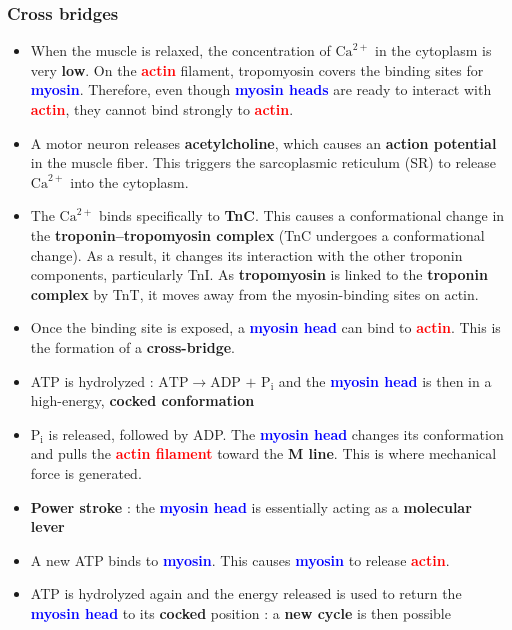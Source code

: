 \documentclass{article}
\begin{document}
\subsubsection{Cross bridges}
\begin{itemize}
    \item When the muscle is relaxed, the concentration of $\text{Ca}^{2+}$ in the cytoplasm is very \textbf{low}. On the \textbf{\textcolor{red}{actin}} filament, tropomyosin covers the binding sites for \textbf{\textcolor{blue}{myosin}}. Therefore, even though \textbf{\textcolor{blue}{myosin heads}} are ready to interact with \textbf{\textcolor{red}{actin}}, they cannot bind strongly to \textbf{\textcolor{red}{actin}}.
    \item A motor neuron releases \textbf{acetylcholine}, which causes an \textbf{action potential} in the muscle fiber. This triggers the sarcoplasmic reticulum (SR) to release $\text{Ca}^{2+}$ into the cytoplasm.
    \item The $\text{Ca}^{2+}$ binds specifically to \textbf{TnC}. This causes a conformational change in the \textbf{troponin–tropomyosin complex} (TnC undergoes a conformational change). As a result, it changes its interaction with the other troponin components, particularly TnI. As \textbf{tropomyosin} is linked to the \textbf{troponin complex} by TnT, it moves away from the myosin-binding sites on actin.
    \item Once the binding site is exposed, a \textbf{\textcolor{blue}{myosin head}} can bind to \textbf{\textcolor{red}{actin}}. This is the formation of a \textbf{cross-bridge}.
    \item ATP is hydrolyzed : $ \text{ATP} \rightarrow \text{ADP + } \mathrm{P_i}$ and the \textbf{\textcolor{blue}{myosin head}} is then in a high-energy, \textbf{cocked conformation}
    \item $\mathrm{P_i}$ is released, followed by ADP. The \textbf{\textcolor{blue}{myosin head}} changes its conformation and pulls the \textbf{\textcolor{red}{actin filament}} toward the \textbf{M line}. This is where mechanical force is generated.
    \item \textbf{Power stroke} : the \textbf{\textcolor{blue}{myosin head}} is essentially acting as a \textbf{molecular lever} 
    \item A new ATP binds to \textbf{\textcolor{blue}{myosin}}. This causes \textbf{\textcolor{blue}{myosin}} to release \textbf{\textcolor{red}{actin}}.
    \item ATP is hydrolyzed again and the energy released is used to return the \textbf{\textcolor{blue}{myosin head}} to its \textbf{cocked} position : a \textbf{new cycle} is then possible

\end{itemize}
\end{document}
